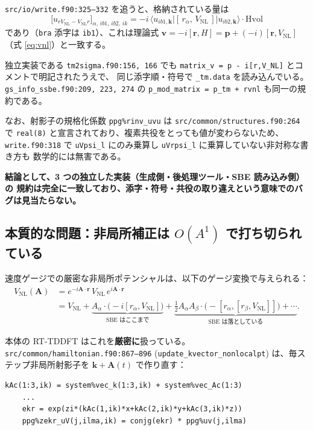 \documentclass[dvipdfmx,a4paper,11pt]{jsarticle}
\newcommand{\file}[1]{\texttt{#1}}
\newcommand{\vk}{\bm{k}}
\newcommand{\vA}{\bm{A}}
\newcommand{\vp}{\bm{p}}
\newcommand{\vr}{\bm{r}}
\begin{document}
\file{src/io/write.f90:325--332} を追うと、格納されている量は
%
\begin{equation}
  \bigl[u_{r V_{\mathrm{NL}} - V_{\mathrm{NL}} r}\bigr]_{\alpha,\, ib1,\, ib2,\, ik}
  = -i\,\langle u_{ib1,\vk} | [\,r_\alpha,\, V_{\mathrm{NL}}\,] | u_{ib2,\vk}\rangle \cdot \mathrm{Hvol}
  \label{eq:rvnl-def}
\end{equation}
%
であり（\verb|bra| 添字は \verb|ib1|）、これは理論式
$\bm{v} = -i[\vr, H] = \vp + (-i)[\vr, V_{\mathrm{NL}}]$（式 \eqref{eq:vnl}）と一致する。

独立実装である \file{tm2sigma.f90:156, 166} でも
\verb|matrix_v = p - i[r,V_NL]| とコメントで明記されたうえで、
同じ添字順・符号で \file{\_tm.data} を読み込んでいる。
\file{gs\_info\_ssbe.f90:209, 223, 274} の \file{p\_mod\_matrix = p\_tm + rvnl} も同一の規約である。

なお、射影子の規格化係数 \verb|ppg%rinv_uvu| は \file{src/common/structures.f90:264} で
\verb|real(8)| と宣言されており、複素共役をとっても値が変わらないため、
\file{write.f90:318} で \verb|uVpsi_l| にのみ乗算し \verb|uVrpsi_l| に乗算していない非対称な書き方も
数学的には無害である。

\textbf{結論として、3 つの独立した実装（生成側・後処理ツール・SBE 読み込み側）の
規約は完全に一致しており、添字・符号・共役の取り違えという意味でのバグは見当たらない。}

\subsection{本質的な問題：非局所補正は $O(A^1)$ で打ち切られている}
\label{sec:vnl-truncation}

速度ゲージでの厳密な非局所ポテンシャルは、以下のゲージ変換で与えられる：
%
\begin{align}
  V_{\mathrm{NL}}(\vA)
  &= e^{-i\vA\cdot\vr}\, V_{\mathrm{NL}}\, e^{i\vA\cdot\vr} \nonumber\\
  &= V_{\mathrm{NL}}
     + \underbrace{A_\alpha\cdot\bigl(-i[r_\alpha, V_{\mathrm{NL}}]\bigr)}_{\text{SBE はここまで}}
     + \underbrace{\frac{1}{2}A_\alpha A_\beta\cdot\bigl(-[r_\alpha,[r_\beta,V_{\mathrm{NL}}]]\bigr) + \cdots}_{\text{SBE は落としている}}.
  \label{eq:vnl-gauge}
\end{align}

本体の RT-TDDFT はこれを\textbf{厳密に}扱っている。
\file{src/common/hamiltonian.f90:867--896}
(\verb|update_kvector_nonlocalpt|) は、毎ステップ非局所射影子を
$\vk + \vA(t)$ で作り直す：
%
\begin{lstlisting}[firstnumber=867,caption={本体 RT-TDDFT の非局所射影子更新（厳密）}]
    kAc(1:3,ik) = system%vec_k(1:3,ik) + system%vec_Ac(1:3)
    ...
    ekr = exp(zi*(kAc(1,ik)*x+kAc(2,ik)*y+kAc(3,ik)*z))
    ppg%zekr_uV(j,ilma,ik) = conjg(ekr) * ppg%uv(j,ilma)
\end{lstlisting}
\end{document}
